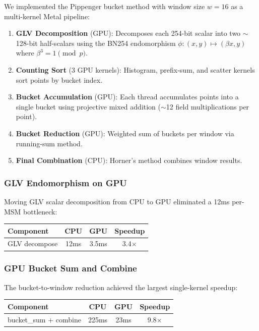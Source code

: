 \documentclass[11pt,a4paper]{article}
\begin{document}
We implemented the Pippenger bucket method with window size $w=16$ as a multi-kernel Metal pipeline:

\begin{enumerate}
    \item \textbf{GLV Decomposition} (GPU): Decomposes each 254-bit scalar into two $\sim$128-bit half-scalars using the BN254 endomorphism $\phi: (x,y) \mapsto (\beta x, y)$ where $\beta^3 = 1 \pmod{p}$.
    \item \textbf{Counting Sort} (3 GPU kernels): Histogram, prefix-sum, and scatter kernels sort points by bucket index.
    \item \textbf{Bucket Accumulation} (GPU): Each thread accumulates points into a single bucket using projective mixed addition ($\sim$12 field multiplications per point).
    \item \textbf{Bucket Reduction} (GPU): Weighted sum of buckets per window via running-sum method.
    \item \textbf{Final Combination} (CPU): Horner's method combines window results.
\end{enumerate}

\subsubsection{GLV Endomorphism on GPU}

Moving GLV scalar decomposition from CPU to GPU eliminated a 12ms per-MSM bottleneck:

\begin{table}[H]
\centering
\begin{tabular}{lccc}
\toprule
\textbf{Component} & \textbf{CPU} & \textbf{GPU} & \textbf{Speedup} \\
\midrule
GLV decompose & 12ms & 3.5ms & 3.4$\times$ \\
\bottomrule
\end{tabular}
\end{table}

\subsubsection{GPU Bucket Sum and Combine}

The bucket-to-window reduction achieved the largest single-kernel speedup:

\begin{table}[H]
\centering
\begin{tabular}{lccc}
\toprule
\textbf{Component} & \textbf{CPU} & \textbf{GPU} & \textbf{Speedup} \\
\midrule
bucket\_sum + combine & 225ms & 23ms & 9.8$\times$ \\
\bottomrule
\end{tabular}
\end{table}
\end{document}
